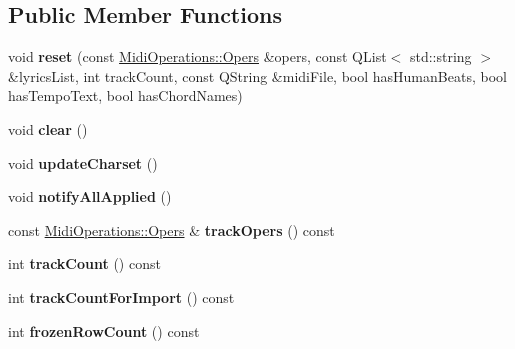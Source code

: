 \subsection*{Public Member Functions}
\begin{DoxyCompactItemize}
\item 
\mbox{\label{class_ms_1_1_tracks_model_a026f4ac54ca504784433705b980dca6b}} 
void {\bfseries reset} (const \hyperlink{struct_ms_1_1_midi_operations_1_1_opers}{Midi\+Operations\+::\+Opers} \&opers, const Q\+List$<$ std\+::string $>$ \&lyrics\+List, int track\+Count, const Q\+String \&midi\+File, bool has\+Human\+Beats, bool has\+Tempo\+Text, bool has\+Chord\+Names)
\item 
\mbox{\label{class_ms_1_1_tracks_model_ac82756eb5ae24b7ed8164026e373433c}} 
void {\bfseries clear} ()
\item 
\mbox{\label{class_ms_1_1_tracks_model_a26f33327c6c77749f947f14198d7a0f2}} 
void {\bfseries update\+Charset} ()
\item 
\mbox{\label{class_ms_1_1_tracks_model_af46348d3c5906e06395b816cba241eae}} 
void {\bfseries notify\+All\+Applied} ()
\item 
\mbox{\label{class_ms_1_1_tracks_model_a953d8c3eb5382af3c271465f72f8c4da}} 
const \hyperlink{struct_ms_1_1_midi_operations_1_1_opers}{Midi\+Operations\+::\+Opers} \& {\bfseries track\+Opers} () const
\item 
\mbox{\label{class_ms_1_1_tracks_model_a41660e0b979be9f0a018828b8d2eaa55}} 
int {\bfseries track\+Count} () const
\item 
\mbox{\label{class_ms_1_1_tracks_model_a434f7d1da3989a100fa9198149c77240}} 
int {\bfseries track\+Count\+For\+Import} () const
\item 
\mbox{\label{class_ms_1_1_tracks_model_ab4fc8cc3a58b217b19d8c791369511a5}} 
int {\bfseries frozen\+Row\+Count} () const
\item 
\mbox{\label{class_ms_1_1_tracks_model_ac63a4392273cbfb59fd277e79a03d493}} 

\end{DoxyCompactItemize}
